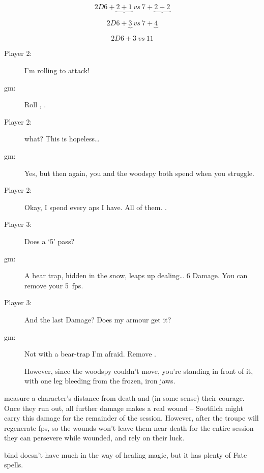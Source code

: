 \begin{multicols}{3}
$$2D6 + \underbrace{2 + 1} ~vs~ 7 + \underbrace{2 + 2}$$

$$2D6 + \underbrace{3} ~vs~ 7 + \underbrace{4}$$

$$2D6+3 ~vs~ 11$$


\bigLine
\vspace{\baselineskip}


\begin{description}
  \item[Player 2:]
  I'm rolling to attack!
  \item[\gls{gm}:]
  Roll , \tn[13].
  \item[Player 2:]
   what?
  This is hopeless\ldots
  \item[\gls{gm}:]
  Yes, but then again, you and the \gls{woodspy} both spend  when you struggle.
  \item[Player 2:]
  Okay, I spend every \glspl{ap} I have.
  All of them.
  .
  \item[Player 3:]
  Does a `5' pass?
  \item[\gls{gm}:]
  A bear trap, hidden in the snow, leaps up dealing\ldots{} 6 Damage.
  You can remove your 5~\glspl{fp}.
  \item[Player 3:]
  And the last Damage?
  Does my armour get it?
  \item[\gls{gm}:]
  Not with a bear-trap I'm afraid.
  Remove .

  However, since the \gls{woodspy} couldn't move, you're standing in front of it, with one leg bleeding from the frozen, iron jaws.
\end{description}

\bigLine
\vspace{\baselineskip}

 measure a character's distance from death and (in some sense) their courage.
Once they run out, all further damage makes a real wound -- Sootfilch might carry this damage for the remainder of the session.
However, after  the troupe will regenerate \glspl{fp}, so the wounds won't leave them near-death for the entire session -- they can persevere while wounded, and rely on their luck.

\Gls{bind} doesn't have much in the way of healing magic, but it has plenty of Fate spells.


\bigLine
\vspace{\baselineskip}



\end{multicols}

